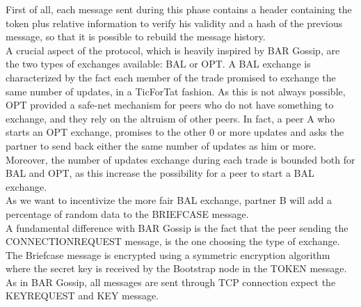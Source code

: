 \documentclass[mscthesis]{usiinfthesis}
\begin{document}
First of all, each message sent during this phase contains a header containing the token plus relative information to verify his validity and a hash of the previous message, so that it is possible to rebuild the message history. \\
A crucial aspect of the protocol, which is heavily inspired by BAR Gossip\citep{li2006bar}, are the two types of exchanges available: BAL or OPT. A BAL exchange is characterized by the fact each member of the trade promised to exchange the same number of updates, in a TicForTat fashion. As this is not always possible, OPT provided a safe-net mechanism for peers who do not have something to exchange, and they rely on the altruism of other peers. In fact, a peer A who starts an OPT exchange, promises to the other 0 or more updates and asks the partner to send back either the same number of updates as him or more. Moreover, the number of updates exchange during each trade is bounded both for BAL and OPT, as this increase the possibility for a peer to start a BAL exchange. \\
As we want to incentivize the more fair BAL exchange, partner B will add a percentage of random data to the BRIEFCASE message.  \\
A fundamental difference with BAR Gossip is the fact that the peer sending the CONNECTIONREQUEST message, is the one choosing the type of exchange.  \\
The Briefcase message is encrypted using a symmetric encryption algorithm where the secret key is received by the Bootstrap node in the TOKEN message. \\
As in BAR Gossip, all messages are sent through TCP connection expect the KEYREQUEST and KEY message.

\begin{table}[H]
\centering
{}
\caption{Header description}
\label{tab:header-bar-message}
\end{table}
\end{document}
